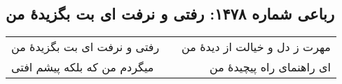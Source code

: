 \begin{center}
\section*{رباعی شماره ۱۴۷۸: رفتی و نرفت ای بت بگزیدهٔ من}
\label{sec:1478}
\begin{longtable}{l p{0.5cm} r}
رفتی و نرفت ای بت بگزیدهٔ من
&&
مهرت ز دل و خیالت از دیدهٔ من
\\
میگردم من که بلکه پیشم افتی
&&
ای راهنمای راه پیچیدهٔ من
\\
\end{longtable}
\end{center}
